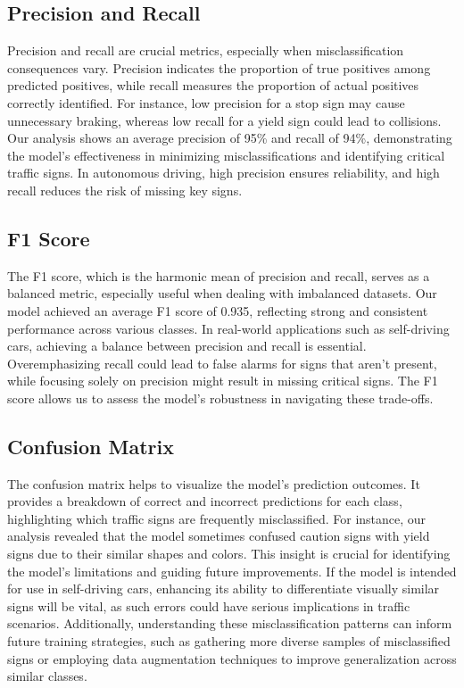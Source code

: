 \documentclass{article} %
\begin{document}
\subsection{Precision and Recall}
Precision and recall are crucial metrics, especially when misclassification consequences vary. Precision indicates the proportion of true positives among predicted positives, while recall measures the proportion of actual positives correctly identified. For instance, low precision for a stop sign may cause unnecessary braking, whereas low recall for a yield sign could lead to collisions. Our analysis shows an average precision of 95\% and recall of 94\%, demonstrating the model’s effectiveness in minimizing misclassifications and identifying critical traffic signs. In autonomous driving, high precision ensures reliability, and high recall reduces the risk of missing key signs.

\subsection{F1 Score}
The F1 score, which is the harmonic mean of precision and recall, serves as a balanced metric, especially useful when dealing with imbalanced datasets. Our model achieved an average F1 score of 0.935, reflecting strong and consistent performance across various classes. In real-world applications such as self-driving cars, achieving a balance between precision and recall is essential. Overemphasizing recall could lead to false alarms for signs that aren’t present, while focusing solely on precision might result in missing critical signs. The F1 score allows us to assess the model's robustness in navigating these trade-offs.

\subsection{Confusion Matrix}
The confusion matrix helps to visualize the model's prediction outcomes. It provides a breakdown of correct and incorrect predictions for each class, highlighting which traffic signs are frequently misclassified. For instance, our analysis revealed that the model sometimes confused caution signs with yield signs due to their similar shapes and colors. This insight is crucial for identifying the model's limitations and guiding future improvements. If the model is intended for use in self-driving cars, enhancing its ability to differentiate visually similar signs will be vital, as such errors could have serious implications in traffic scenarios. Additionally, understanding these misclassification patterns can inform future training strategies, such as gathering more diverse samples of misclassified signs or employing data augmentation techniques to improve generalization across similar classes.
\end{document}
